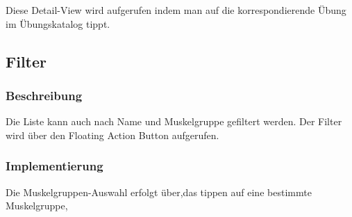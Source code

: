 \documentclass[FIPLY_base.tex]{subfiles}
\begin{document}
Diese Detail-View wird aufgerufen indem man auf die korrespondierende Übung im Übungskatalog tippt.

\subsection{Filter}
\subsubsection{Beschreibung}
Die Liste kann auch nach Name und Muskelgruppe gefiltert werden. 
Der Filter wird über den Floating Action Button aufgerufen.

\subsubsection{Implementierung}
Die Muskelgruppen-Auswahl erfolgt über,das tippen auf eine bestimmte Muskelgruppe,
\end{document}
